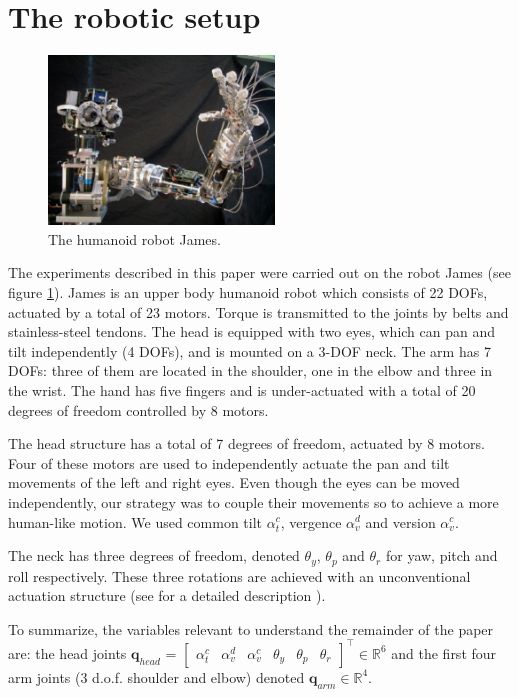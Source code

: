 \section{The robotic setup}
\label{Sec:setup}

\begin{figure}
\centering
\includegraphics[width=60mm]{Figure/James1.eps}
\caption{The humanoid robot James.}
\label{Fig:PicureJames}
\end{figure}

The experiments described in this paper were carried out on the robot 
James (see figure \ref{Fig:PicureJames}). James is an upper body 
humanoid robot which consists of 22 DOFs, actuated by a total of 
23 motors. Torque is transmitted to the joints by belts and 
stainless-steel tendons. The head is equipped with two eyes, which 
can pan and tilt independently (4 DOFs), and is mounted on a 3-DOF 
neck. The arm has 7 DOFs: three of them are located in the shoulder, 
one in the elbow and three in the wrist. The hand has five fingers 
and is under-actuated with a total of 20 degrees of freedom controlled 
by 8 motors. 

The head structure has a total of 7 degrees of freedom, actuated by 8 
motors. Four of these motors are used to independently actuate the pan 
and tilt movements of the left and right eyes. Even though the eyes 
can be moved independently, our strategy was to couple their movements 
so to achieve a more human-like motion. We used common tilt 
$\alpha_t^c$, vergence $\alpha_v^d$ and version $\alpha_v^c$. 

The neck has three degrees of freedom, denoted $\theta_y$, 
$\theta_p$ and $\theta_r$ for yaw, pitch and roll respectively. These 
three rotations are achieved with an unconventional actuation structure 
(see for a detailed description \cite{jamone06james}). 

To summarize, the variables relevant to understand the remainder of the paper
are: the head joints 
$\mathbf q_{head}$ = $\begin{bmatrix} \alpha_t^c & \alpha_v^d & \alpha_v^c & \theta_y & \theta_p & \theta_r \end{bmatrix}^\top \in \mathbb R^6$ and the first four arm joints (3 d.o.f. shoulder and elbow) denoted $\mathbf q_{arm} \in \mathbb R^4$.
